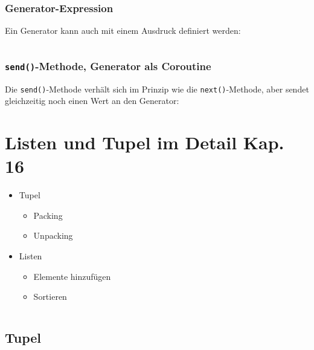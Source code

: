 \begin{minipage}[t]{0.44\textwidth}
		\subsubsection{Generator-Expression}
	Ein Generator kann auch mit einem Ausdruck definiert werden:
\end{minipage}
\begin{minipage}[t]{0.02\textwidth} $ \quad $\end{minipage}
\begin{minipage}[t]{0.54\textwidth}
	
\end{minipage}



\subsubsection{\texttt{send()}-Methode, Generator als Coroutine}
Die \texttt{send()}-Methode verhält sich im Prinzip wie die \texttt{next()}-Methode, aber sendet gleichzeitig noch einen Wert an den Generator:



\section[Listen und Tupel im Detail]{Listen und Tupel im Detail \tiny{Kap. 16}}
\begin{minipage}[t]{0.49\textwidth}
	
	\begin{itemize}
		\item Tupel
		\begin{itemize}
			\item Packing
			\item Unpacking
		\end{itemize}
		\item Listen
		\begin{itemize}
			\item Elemente hinzufügen
			\item Sortieren
		\end{itemize}
	\end{itemize}
\end{minipage}
\begin{minipage}[t]{0.02\textwidth} $ \quad $\end{minipage}
\begin{minipage}[t]{0.49\textwidth}
	\subsection{Tupel}
	
\end{minipage}

